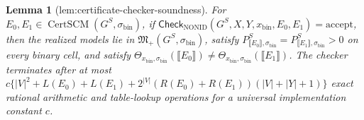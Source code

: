 \documentclass{article}
\newtheorem{lemma}{Lemma}
\begin{document}
\begin{lemma}[lem:certificate-checker-soundness]\label{lem:certificate-checker-soundness}
For \(E_0,E_1\in\operatorname{CertSCM}(G^S,\sigma_{\mathrm{bin}})\), if \(\mathsf{Check}_{\mathrm{NONID}}(G^S,X,Y,x_{\mathrm{bin}},E_0,E_1)=\mathrm{accept}\), then the realized models lie in \(\mathfrak M_+(G^S,\sigma_{\mathrm{bin}})\), satisfy \(P_{\llbracket E_0\rrbracket,\sigma_{\mathrm{bin}}}^S=P_{\llbracket E_1\rrbracket,\sigma_{\mathrm{bin}}}^S>0\) on every binary cell, and satisfy \(\Theta_{x_{\mathrm{bin}},\sigma_{\mathrm{bin}}}(\llbracket E_0\rrbracket)\ne\Theta_{x_{\mathrm{bin}},\sigma_{\mathrm{bin}}}(\llbracket E_1\rrbracket)\). The checker terminates after at most \(c\{|V|^2+L(E_0)+L(E_1)+2^{|V|}(R(E_0)+R(E_1))(|V|+|Y|+1)\}\) exact rational arithmetic and table-lookup operations for a universal implementation constant \(c\).
\end{lemma}
\end{document}
